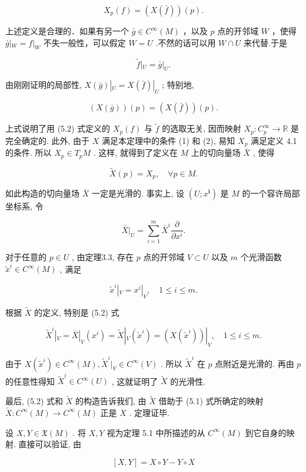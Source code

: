 $$
X _ {p} (f) = \left(X (\bar {f})\right) (p). %
$$

上述定义是合理的．如果有另一个  $\bar{g}\in C^{\infty}(M)$  ，以及  $p$  点的开邻域 $W$  ，使得  $\bar{g} |_{W} = f|_{W}$  不失一般性，可以假定  $W = U$  .不然的话可以用 $W\cap U$  来代替.于是

$$
\tilde {f} | _ {U} = \bar {g} | _ {U}.
$$

由刚刚证明的局部性,  $X(\bar{g})|_{U} = X(\bar{f})|_{U}$ ; 特别地,

$$
(X (\bar {g})) (p) = (X (\bar {f})) (p).
$$

上式说明了用 (5.2) 式定义的  $X_{p}(f)$  与  $\tilde{f}$  的选取无关, 因而映射  $X_{p}: C_{p}^{\infty} \to \mathbb{R}$  是完全确定的. 此外, 由于  $X$  满足本定理中的条件 (1) 和 (2), 易知  $X_{p}$  满足定义 4.1 的条件. 所以  $X_{p} \in T_{p}M$ . 这样, 就得到了定义在  $M$  上的切向量场  $\bar{X}$ , 使得

$$
\tilde {X} (p) = X _ {p}, \quad \forall p \in M.
$$

如此构造的切向量场  $\bar{X}$  一定是光滑的. 事实上, 设  $(U; x^{\mathbf{i}})$  是  $M$  的一个容许局部坐标系, 令

$$
\bar {X} | _ {U} = \sum_ {i = 1} ^ {m} \bar {X} ^ {i} \frac {\partial}{\partial x ^ {i}}.
$$

对于任意的  $p \in U$ , 由定理3.3, 存在  $p$  点的开邻域  $V \subset U$  以及  $m$  个光滑函数  $\tilde{x}^i \in C^\infty(M)$ , 满足

$$
\tilde {x} ^ {i} | _ {V} = x ^ {i} | _ {V}, \quad 1 \leqslant i \leqslant m.
$$

根据  $\tilde{X}$  的定义, 特别是 (5.2) 式

$$
\tilde {X} ^ {i} | _ {V} = \bar {X} | _ {V} \left(x ^ {i}\right) = \tilde {X} | _ {V} \left(\tilde {x} ^ {i}\right) = \left(X \left(\tilde {x} ^ {i}\right)\right) | _ {V}, \quad 1 \leqslant i \leqslant m.
$$

由于  $X(\tilde{x}^i) \in C^\infty(M), \tilde{X}^i|_V \in C^\infty(V)$ . 所以  $\tilde{X}^i$  在  $p$  点附近是光滑的. 再由  $p$  的任意性得知  $\tilde{X}^i \in C^\infty(U)$ , 这就证明了  $\tilde{X}$  的光滑性.

最后, (5.2) 式和  $\tilde{X}$  的构造告诉我们, 由  $\tilde{X}$  借助于 (5.1) 式所确定的映射  $\tilde{X}: C^{\infty}(M) \to C^{\infty}(M)$  正是  $X$ . 定理证毕.

设  $X, Y \in \mathfrak{X}(M)$ . 将  $X, Y$  视为定理 5.1 中所描述的从  $C^\infty(M)$  到它自身的映射. 直接可以验证, 由

$$
[ X, Y ] = X \circ Y - Y \circ X %
$$

